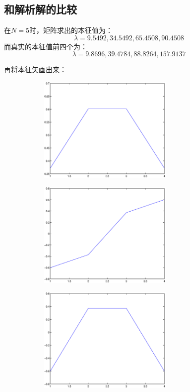 \documentclass[paper=a4, fontsize=11pt]{scrartcl} %
\numberwithin{equation}{section} %
\numberwithin{figure}{section} %
\numberwithin{table}{section} %
\begin{document}
\begin{CJK*}{UTF8}{gbsn}
\subsection{和解析解的比较}
在$N=5$时，矩阵求出的本征值为：
\begin{equation}
\lambda = 9.5492, 34.5492, 65.4508, 90.4508
\end{equation}
而真实的本征值前四个为：
\begin{equation}
\lambda = 9.8696, 39.4784, 88.8264, 157.9137
\end{equation}

再将本征矢画出来：

\begin{figure}[H]
\centering
\begin{subfigure}{70mm}
  \centering
  \includegraphics[width=65mm]{figure-1-1-1.eps}
  \label{fig:sub1}
\end{subfigure}
\begin{subfigure}{70mm}
  \centering
  \includegraphics[width=65mm]{figure-1-1-2.eps}
  \label{fig:sub2}
\end{subfigure}
\begin{subfigure}{70mm}
  \centering
  \includegraphics[width=65mm]{figure-1-1-3.eps}

\end{subfigure}
\end{figure}
\end{CJK*}
\end{document}
